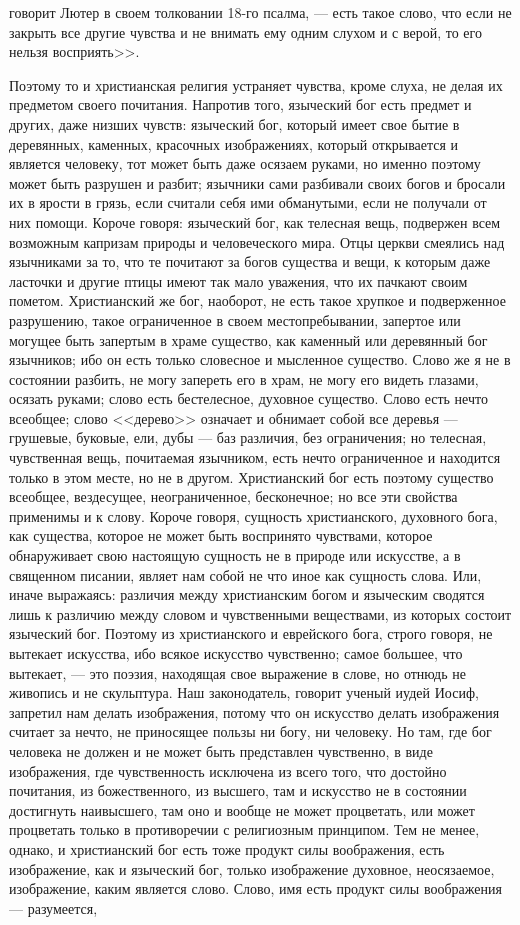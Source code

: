 \documentclass[12pt]{article}
\begin{document}
говорит Лютер в своем толковании 18-го псалма, --- есть такое слово, что если не закрыть все другие чувства и не внимать ему одним слухом и с верой, то его нельзя восприять>>. 

Поэтому то и христианская религия устраняет чувства, кроме слуха, не делая их предметом своего почитания. Напротив того, языческий бог есть предмет и других, даже низших чувств: языческий бог, который имеет свое бытие в деревянных, каменных, красочных изображениях, который открывается и является человеку, тот может быть даже осязаем руками, но именно поэтому может быть разрушен и разбит; язычники сами разбивали своих богов и бросали их в ярости в грязь, если считали себя ими обманутыми, если не получали от них помощи. Короче говоря: языческий бог, как телесная вещь, подвержен всем возможным капризам природы и человеческого мира. Отцы церкви смеялись над язычниками за то, что те почитают за богов существа и вещи, к которым даже ласточки и другие птицы имеют так мало уважения, что их пачкают своим пометом. Христианский же бог, наоборот, не есть такое хрупкое и подверженное разрушению, такое ограниченное в своем местопребывании, запертое или могущее быть запертым в храме существо, как каменный или деревянный бог язычников; ибо он есть только словесное и мысленное существо. Слово же я не в состоянии разбить, не могу запереть его в храм, не могу его видеть глазами, осязать руками; слово есть бестелесное, духовное существо. Слово есть нечто всеобщее; слово <<дерево>> означает и обнимает собой все деревья --- грушевые, буковые, ели, дубы --- баз различия, без ограничения; но телесная, чувственная вещь, почитаемая язычником, есть нечто ограниченное и находится только в этом месте, но не в другом. Христианский бог есть поэтому существо всеобщее, вездесущее, неограниченное, бесконечное; но все эти свойства применимы и к слову. Короче говоря, сущность христианского, духовного бога, как существа, которое не может быть воспринято чувствами, которое обнаруживает свою настоящую сущность не в природе или искусстве, а в священном писании, являет нам собой не что иное как сущность слова. Или, иначе выражаясь: различия между христианским богом и языческим сводятся лишь к различию между словом и чувственными веществами, из которых состоит языческий бог. Поэтому из христианского и еврейского бога, строго говоря, не вытекает искусства, ибо всякое искусство чувственно; самое большее, что вытекает, --- это поэзия, находящая свое выражение в слове, но отнюдь не живопись и не скульптура. Наш законодатель, говорит ученый иудей Иосиф, запретил нам делать изображения, потому что он искусство делать изображения считает за нечто, не приносящее пользы ни богу, ни человеку. Но там, где бог человека не должен и не может быть представлен чувственно, в виде изображения, где чувственность исключена из всего того, что достойно почитания, из божественного, из высшего, там и искусство не в состоянии достигнуть наивысшего, там оно и вообще не может процветать, или может процветать только в противоречии с религиозным принципом. Тем не менее, однако, и христианский бог есть тоже продукт силы воображения, есть изображение, как и языческий бог, только изображение духовное, неосязаемое, изображение, каким является слово. Слово, имя есть продукт силы воображения --- разумеется, 
\end{document}
